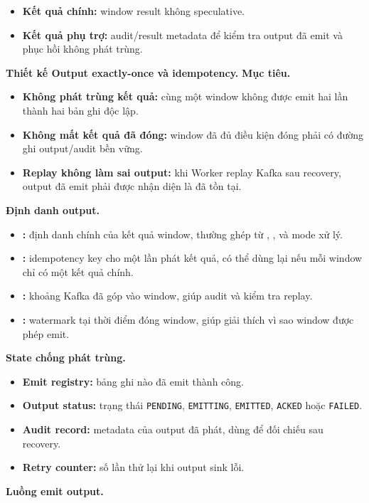 \documentclass[12pt,a4paper]{article}
\begin{document}
\begin{itemize}
\item \textbf{Kết quả chính:} window result không speculative.
\item \textbf{Kết quả phụ trợ:} audit/result metadata để kiểm tra output đã emit và phục hồi không phát trùng.
\end{itemize}
\textbf{Thiết kế Output exactly-once và idempotency.}
\textbf{Mục tiêu.}

\begin{itemize}
\item \textbf{Không phát trùng kết quả:} cùng một window không được emit hai lần thành hai bản ghi độc lập.
\item \textbf{Không mất kết quả đã đóng:} window đã đủ điều kiện đóng phải có đường ghi output/audit bền vững.
\item \textbf{Replay không làm sai output:} khi Worker replay Kafka sau recovery, output đã emit phải được nhận diện là đã tồn tại.
\end{itemize}
\textbf{Định danh output.}

\begin{itemize}
\item \textbf{:} định danh chính của kết quả window, thường ghép từ , ,  và mode xử lý.
\item \textbf{:} idempotency key cho một lần phát kết quả, có thể dùng lại  nếu mỗi window chỉ có một kết quả chính.
\item \textbf{:} khoảng Kafka  đã góp vào window, giúp audit và kiểm tra replay.
\item \textbf{:} watermark tại thời điểm đóng window, giúp giải thích vì sao window được phép emit.
\end{itemize}
\textbf{State chống phát trùng.}

\begin{itemize}
\item \textbf{Emit registry:} bảng ghi  nào đã emit thành công.
\item \textbf{Output status:} trạng thái \texttt{PENDING}, \texttt{EMITTING}, \texttt{EMITTED}, \texttt{ACKED} hoặc \texttt{FAILED}.
\item \textbf{Audit record:} metadata của output đã phát, dùng để đối chiếu sau recovery.
\item \textbf{Retry counter:} số lần thử lại khi output sink lỗi.
\end{itemize}
\textbf{Luồng emit output.}
\end{document}
